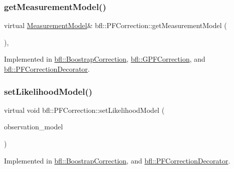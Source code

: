 \subsubsection{\texorpdfstring{get\+Measurement\+Model()}{getMeasurementModel()}}
{\footnotesize\ttfamily virtual \mbox{\hyperlink{classbfl_1_1MeasurementModel}{Measurement\+Model}}\& bfl\+::\+P\+F\+Correction\+::get\+Measurement\+Model (\begin{DoxyParamCaption}{ }\end{DoxyParamCaption})\hspace{0.3cm}{\ttfamily [protected]}, {}}



Implemented in \mbox{\hyperlink{classbfl_1_1BoostrapCorrection_a4d11bb3e7e27dcd62bb7e1b5df83c8db}{bfl\+::\+Boostrap\+Correction}}, \mbox{\hyperlink{classbfl_1_1GPFCorrection_a670298795b61fab434eefd192b7fe81f}{bfl\+::\+G\+P\+F\+Correction}}, and \mbox{\hyperlink{classbfl_1_1PFCorrectionDecorator_a3d5b289a95cf6623922153b469755e80}{bfl\+::\+P\+F\+Correction\+Decorator}}.

\mbox{\label{classbfl_1_1PFCorrection_aa84e757c694d4ad375cdd543d42ac34c}} 
\subsubsection{\texorpdfstring{set\+Likelihood\+Model()}{setLikelihoodModel()}}
{\footnotesize\ttfamily virtual void bfl\+::\+P\+F\+Correction\+::set\+Likelihood\+Model (\begin{DoxyParamCaption}\item[{std\+::unique\+\_\+ptr$<$ \mbox{\hyperlink{classbfl_1_1LikelihoodModel}{Likelihood\+Model}} $>$}]{observation\+\_\+model }\end{DoxyParamCaption})\hspace{0.3cm}{\ttfamily [pure virtual]}}



Implemented in \mbox{\hyperlink{classbfl_1_1BoostrapCorrection_a75d770c17ac4142833c926e9e6dc32db}{bfl\+::\+Boostrap\+Correction}}, and \mbox{\hyperlink{classbfl_1_1PFCorrectionDecorator_ab1065f8e47e4e51bc846b2d693b4bb88}{bfl\+::\+P\+F\+Correction\+Decorator}}.

\mbox{\label{classbfl_1_1PFCorrection_a9844514568f65a0e5fa2cffadea460c6}} 
